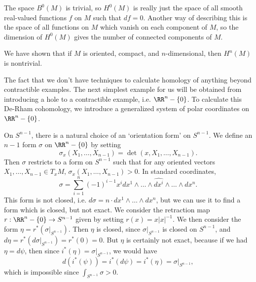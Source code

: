 \begin{example}
    The space $B^0(M)$ is trivial, so $H^0(M)$ is really just the space of all smooth real-valued functions $f$ on $M$ such that $df = 0$. Another way of describing this is the space of all functions on $M$ which vanish on each component of $M$, so the dimension of $H^0(M)$ gives the number of connected components of $M$.
\end{example}

\begin{example}
    We have shown that if $M$ is oriented, compact, and $n$-dimensional, then $H^n(M)$ is nontrivial.
\end{example}

The fact that we don't have techniques to calculate homology of anything beyond contractible examples. The next simplest example for us will be obtained from introducing a hole to a contractible example, i.e. $\RR^n - \{ 0 \}$. To calculate this De-Rham cohomology, we introduce a generalized system of polar coordinates on $\RR^n - \{ 0 \}$.

On $S^{n-1}$, there is a natural choice of an `orientation form' on $S^{n-1}$. We define an $n-1$ form $\sigma$ on $\RR^n - \{ 0 \}$ by setting
%
\[ \sigma_x(X_1, \dots, X_{n-1}) = \det(x,X_1, \dots, X_{n-1}). \]
%
Then $\sigma$ restricts to a form on $S^{n-1}$ such that for any oriented vectors $X_1, \dots, X_{n-1} \in T_x M$, $\sigma_x(X_1, \dots, X_{n-1}) > 0$. In standard coordinates,
%
\[ \sigma = \sum_{i = 1}^n (-1)^{i-1} x^i dx^1 \wedge \dots \wedge \widehat{dx^i} \wedge \dots \wedge dx^n. \]
%
This form is not closed, i.e. $d\sigma = n \cdot dx^1 \wedge \dots \wedge dx^n$, but we can use it to find a form which is closed, but not exact. We consider the retraction map $r: \RR^n - \{ 0 \} \to S^{n-1}$ given by setting $r(x) = x |x|^{-1}$. We then consider the form $\eta = r^*( \sigma|_{S^{n-1}} )$. Then $\eta$ is closed, since $\sigma|_{S^{n-1}}$ is closed on $S^{n-1}$, and $d\eta = r^*( d\sigma|_{S^{n-1}}) = r^*(0) = 0$. But $\eta$ is certainly not exact, because if we had $\eta = d\psi$, then since $i^*(\eta) = \sigma|_{S^{n-1}}$, we would have
%
\[ d(i^*(\psi)) = i^*(d\psi) = i^*(\eta) = \sigma|_{S^{n-1}}, \]
%
which is impossible since $\int_{S^{n-1}} \sigma > 0$.


